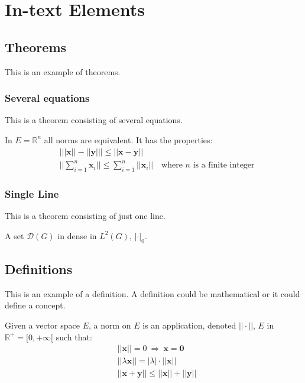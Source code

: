 \documentclass[11pt,fleqn]{book} %
\begin{document}
\chapter{In-text Elements}

\section{Theorems}

This is an example of theorems.

\subsection{Several equations}
This is a theorem consisting of several equations.

\begin{theorem}
In $E=\mathbb{R}^n$ all norms are equivalent. It has the properties:
\begin{align}
& \big| ||\mathbf{x}|| - ||\mathbf{y}|| \big|\leq || \mathbf{x}- \mathbf{y}||\\
&  ||\sum_{i=1}^n\mathbf{x}_i||\leq \sum_{i=1}^n||\mathbf{x}_i||\quad\text{where $n$ is a finite integer}
\end{align}
\end{theorem}

\subsection{Single Line}
This is a theorem consisting of just one line.

\begin{theorem}
A set $\mathcal{D}(G)$ in dense in $L^2(G)$, $|\cdot|_0$. 
\end{theorem}


\section{Definitions}

This is an example of a definition. A definition could be mathematical or it could define a concept.

\begin{definition}
Given a vector space $E$, a norm on $E$ is an application, denoted $||\cdot||$, $E$ in $\mathbb{R}^+=[0,+\infty[$ such that:
\begin{align}
& ||\mathbf{x}||=0\ \Rightarrow\ \mathbf{x}=\mathbf{0}\\
& ||\lambda \mathbf{x}||=|\lambda|\cdot ||\mathbf{x}||\\
& ||\mathbf{x}+\mathbf{y}||\leq ||\mathbf{x}||+||\mathbf{y}||
\end{align}
\end{definition}
\end{document}
